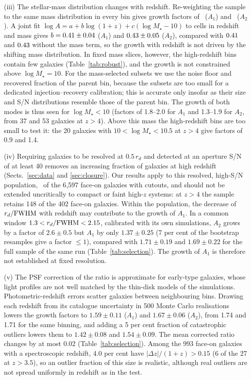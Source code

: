 \documentclass[fleqn,usenatbib]{mnras}
\newcommand{\Mstar}{M_\star}
\begin{document}
(iii) The stellar-mass distribution changes with redshift. Re-weighting the
sample to the same mass distribution in every bin gives growth factors of
\numMassOne\ ($A_1$) and \numMassTwo\ ($A_2$). A joint fit
$\log A=a+b\log(1+z)+c(\log\Mstar-10)$ to cells in redshift and mass gives
$b=0.41\pm0.04$ ($A_1$) and $0.43\pm0.05$
($A_2$), compared with $0.41$ and $0.43$ without the mass term, so
the growth with redshift is not driven by the shifting mass distribution. In
fixed mass slices, however, the high-redshift bins contain few galaxies
(Table~\ref{tab:robust}), and the growth is not constrained above
$\log\Mstar=10$. For the mass-selected subsets we use the noise floor and
recovered fraction of the parent bin, because the subsets are too small for a
dedicated injection--recovery calibration; this is accurate only insofar as their
size and S/N distributions resemble those of the parent bin. The growth of both
modes is thus seen for $\log\Mstar<10$ (factors of 1.8--2.0 for $A_1$ and
1.3--1.9 for $A_2$, from 37 and 53 galaxies at $z>4$). Above this mass the
high-redshift bins are too small to test it: the 20 galaxies with
$10<\log\Mstar<10.5$ at $z>4$ give factors of 0.9 and 1.4.

(iv) Requiring galaxies to be resolved at $0.5\,r_d$ and detected at an aperture
S/N of at least 40 removes an increasing fraction of galaxies at high redshift
(Sects.~\ref{sec:data} and \ref{sec:closure}). Our results apply to this resolved,
high-S/N population, \numNvalid\ of the 6{,}597 face-on galaxies with cutouts, and
should not be extended uncritically to compact or faint high-$z$ systems: at
$z>4$ the sample retains 148 of the 402 face-on galaxies. Within the population,
the decrease of $r_d/{\rm FWHM}$ with redshift may contribute to the growth of
$A_1$. In a common window $1.3<r_d/{\rm FWHM}<2.15$, calibrated with its own
simulations, $A_2$ grows by a factor of $2.6\pm0.5$ but $A_1$ by only
$1.37\pm0.25$ (7 per cent of the bootstrap resamples give a factor $\leq1$),
compared with $1.71\pm0.19$ and $1.69\pm0.22$ for the full sample of the same run
(Table~\ref{tab:selection}). The growth of $A_1$ is therefore not established at
fixed resolution.

(v) The PSF correction of the ratio is approximate for early-type galaxies,
whose light profiles are not well matched by the thin-disk models of the
simulations. Photometric-redshift errors scatter galaxies between
neighbouring bins. Drawing each redshift from its catalogue uncertainty in 500
Monte Carlo realisations lowers the growth factors to $1.59\pm0.11$ ($A_1$) and
$1.67\pm0.06$ ($A_2$), from 1.74 and 1.71 for the same binning, and adding a
5 per cent fraction of catastrophic outliers lowers them to $1.42\pm0.08$ and
$1.54\pm0.09$. The mean corrected ratio changes by at most 0.02
(Table~\ref{tab:selection}). Among the 993 face-on galaxies with a spectroscopic
redshift, 4.0 per cent have $|\Delta z|/(1+z)>0.15$ (6 of the 27 at $z>3.5$), so
an outlier fraction of this size is realistic, although real outliers are not
spread uniformly in redshift as in the test.
\end{document}
